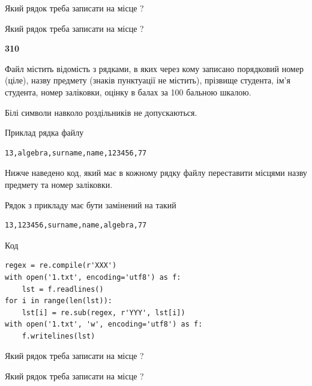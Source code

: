 Який рядок треба записати на місце  ?\par
\vspace{5mm}


Який рядок треба записати на місце  ?\par


\newpage

{\begin {center}\textbf{ 310}\end {center}}\par
Файл  містить відомість з рядками, в яких через кому записано поряд\-ковий номер (ціле), назву предмету (знаків пунктуації не містить), прізвище студента, ім'я студента, номер заліковки, оцінку в балах за 100 бальною шкалою.

Білі символи навколо роздільників не допускаються.

Приклад рядка файлу



\begin{verbatim}
13,algebra,surname,name,123456,77
\end{verbatim}


Нижче наведено код, який має в кожному рядку файлу переставити місцями назву предмету та номер заліковки.

Рядок з прикладу має бути замінений на такий



\begin{verbatim}
13,123456,surname,name,algebra,77
\end{verbatim}




Код



\begin{verbatim}
regex = re.compile(r'XXX')
with open('1.txt', encoding='utf8') as f:
    lst = f.readlines()
for i in range(len(lst)):
    lst[i] = re.sub(regex, r'YYY', lst[i])
with open('1.txt', 'w', encoding='utf8') as f:
    f.writelines(lst)
\end{verbatim}







Який рядок треба записати на місце  ?\par
\vspace{5mm}


Який рядок треба записати на місце  ?\par


